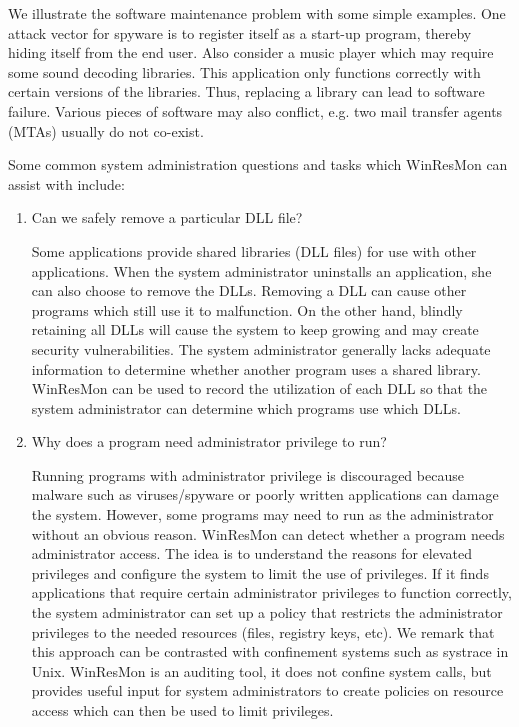 We illustrate the software maintenance problem with some simple examples.  One
attack vector for spyware is to register itself as a start-up program, thereby
hiding itself from the end user.  Also consider a music player which may
require some sound decoding libraries.  This application only functions
correctly with certain versions of the libraries.  Thus, replacing a library
can lead to software failure.  Various pieces of software may also conflict,
e.g.  two mail transfer agents (MTAs) usually do not co-exist.

Some common system administration questions and tasks which WinResMon 
can assist with include:

\begin{enumerate}

\item Can we safely remove a particular DLL file?

Some applications provide shared libraries (DLL files) for use with other
applications.  When the system administrator uninstalls an application, she
can also choose to remove the DLLs.  Removing a DLL can cause other programs
which still use it to malfunction.  On the other hand, blindly retaining all
DLLs will cause the system to keep growing and may create security
vulnerabilities.  The system administrator generally lacks adequate
information to determine whether another program uses a shared
library. WinResMon can be used to record the utilization of each DLL so that the
system administrator can determine which programs use which DLLs.

\item Why does a program need administrator privilege to run?

Running programs with administrator privilege is discouraged because malware
such as viruses/spyware or poorly written applications can damage the system.
However, some programs may need to run as the administrator without an obvious
reason.  WinResMon can detect whether a program needs administrator access.  The
idea is to understand the reasons for elevated privileges and configure the
system to limit the use of privileges.  If it finds applications that require
certain administrator privileges to function correctly, the system
administrator can set up a policy that restricts the administrator privileges
to the needed resources (files, registry keys, etc).  
We remark that this approach can be contrasted with confinement systems
such as systrace \cite{systrace} in Unix.
WinResMon is an auditing tool, it does not confine system calls, but
provides useful input for system administrators to create policies 
on resource access which can then be used to limit privileges.


\end{enumerate}
